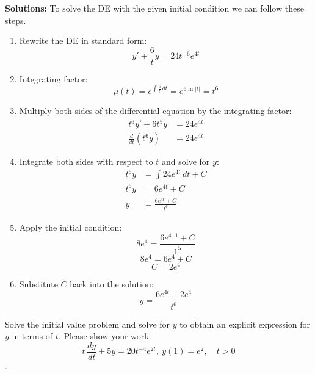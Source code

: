 \ifnum {} {\color{DarkBlue} 
\textbf{Solutions:}
To solve the DE with the given initial condition we can follow these steps.
\begin{enumerate}
    \item Rewrite the DE in standard form:
   \[ y' + \frac{6}{t} y = 24 t^{-6} e^{4t} \]
   \item Integrating factor:
   \[ \mu(t) = e^{\int \frac{6}{t} \, dt} = e^{6 \ln |t|} = t^6 \]
   \item Multiply both sides of the differential equation by the integrating factor:
   \begin{align*}
       t^6 y' + 6 t^5 y &= 24 e^{4t} \\
       \frac{d}{dt} (t^6 y) &= 24 e^{4t}
   \end{align*} 
   \item Integrate both sides with respect to \( t \) and solve for $y$:
   \begin{align}
       t^6 y &= \int 24 e^{4t} \, dt + C \\
       t^6 y &= 6 e^{4t} + C \\
        y &= \frac{6 e^{4t} + C}{t^6} 
   \end{align} 
   \item Apply the initial condition:
   \[ 8e^4 = \frac{6 e^{4 \cdot 1} + C}{1^5} \]
   \[ 8e^4 = 6 e^4 + C \]
   \[ C = 2 e^4 \]
   \item Substitute \( C \) back into the solution:
   \[ y = \frac{6 e^{4t} +2 e^4}{t^6} \]
\end{enumerate}
} 
\else 
\newpage
\fi
\fi   



\ifnum {}
\question[4] 
Solve the initial value problem and solve for $y$ to obtain an explicit expression for $y$ in terms of $t$. Please show your work.
$$\displaystyle t\,\frac{dy}{dt} + 5y =  20 t^{-4}e^{2t}, \ y(1) = e^2, \quad t > 0$$.

